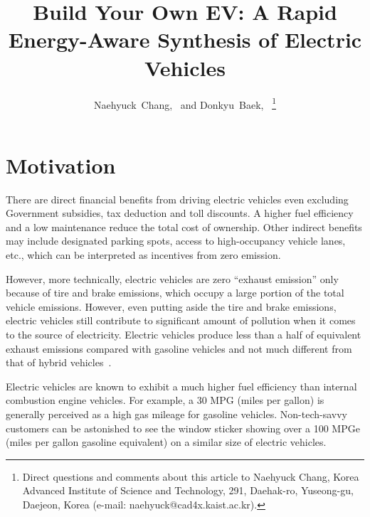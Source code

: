 \documentclass[journal]{IEEEtran}
\begin{document}
\title{Build Your Own EV: A Rapid Energy-Aware Synthesis of Electric Vehicles}

\author{
	Naehyuck~Chang,~ and
	Donkyu~Baek,~
\thanks{Direct questions and comments about this article to Naehyuck Chang, Korea Advanced Institute of Science and Technology, 291, Daehak-ro, Yuseong-gu, Daejeon, Korea (e-mail: naehyuck@cad4x.kaist.ac.kr).}
}

\maketitle



\section{Motivation} \label{sec:motivation}

There are direct financial benefits from driving electric vehicles even excluding Government subsidies, tax deduction and toll discounts. A higher fuel efficiency and a low maintenance reduce the total cost of ownership. %
Other indirect benefits may include designated parking spots, access to high-occupancy vehicle lanes, etc., which can be interpreted as incentives from zero emission. %

However, more technically, electric vehicles are zero ``exhaust emission'' only because of tire and brake emissions, which occupy a large portion of the total vehicle emissions. However, even putting aside the tire and brake emissions, electric vehicles still contribute to significant amount of pollution when it comes to the source of electricity. Electric vehicles produce less than a half of equivalent exhaust emissions compared with gasoline vehicles and not much different from that of hybrid vehicles~\cite{AFDC}.

Electric vehicles are known to exhibit a much higher fuel efficiency than internal combustion engine vehicles. For example, a 30 MPG (miles per gallon) is generally perceived as a high gas mileage for gasoline vehicles. Non-tech-savvy customers can be astonished to see the window sticker showing over a 100 MPGe (miles per gallon gasoline equivalent) on a similar size of electric vehicles. 
\end{document}
